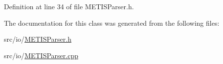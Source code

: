 Definition at line 34 of file M\-E\-T\-I\-S\-Parser.\-h.



The documentation for this class was generated from the following files\-:\begin{DoxyCompactItemize}
\item 
src/io/\hyperlink{_m_e_t_i_s_parser_8h}{M\-E\-T\-I\-S\-Parser.\-h}\item 
src/io/\hyperlink{_m_e_t_i_s_parser_8cpp}{M\-E\-T\-I\-S\-Parser.\-cpp}\end{DoxyCompactItemize}
